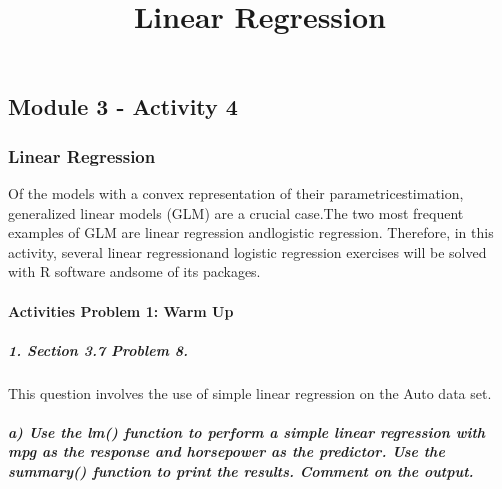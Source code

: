 \documentclass[
  letterpaper,
  DIV=11,
  numbers=noendperiod]{scrartcl}
\title{Linear Regression}
\author{}
\date{}
\let\oldparagraph\paragraph
\renewcommand{\paragraph}[1]{\oldparagraph{#1}\mbox{}}
\let\oldsubparagraph\subparagraph
\renewcommand{\subparagraph}[1]{\oldsubparagraph{#1}\mbox{}}
\begin{document}
\maketitle
\ifdefined\Shaded\renewenvironment{Shaded}{\begin{tcolorbox}[interior hidden, boxrule=0pt, sharp corners, borderline west={3pt}{0pt}{shadecolor}, frame hidden, enhanced, breakable]}{\end{tcolorbox}}\fi

\hypertarget{module-3---activity-4}{%
\subsection{Module 3 - Activity 4}\label{module-3---activity-4}}

\hypertarget{linear-regression}{%
\subsubsection{Linear Regression}\label{linear-regression}}

Of the models with a convex representation of their
parametricestimation, generalized linear models (GLM) are a crucial
case.The two most frequent examples of GLM are linear regression
andlogistic regression. Therefore, in this activity, several linear
regressionand logistic regression exercises will be solved with R
software andsome of its packages.

\hypertarget{activities-problem-1-warm-up}{%
\paragraph{Activities Problem 1: Warm
Up}\label{activities-problem-1-warm-up}}

\hypertarget{section-3.7-problem-8.}{%
\subparagraph{1. Section 3.7 Problem 8.}\label{section-3.7-problem-8.}}

This question involves the use of simple linear regression on the Auto
data set.

\hypertarget{a-use-the-lm-function-to-perform-a-simple-linear-regression-with-mpg-as-the-response-and-horsepower-as-the-predictor.-use-the-summary-function-to-print-the-results.-comment-on-the-output.}{%
\subparagraph{a) Use the lm() function to perform a simple linear
regression with mpg as the response and horsepower as the predictor. Use
the summary() function to print the results. Comment on the
output.}\label{a-use-the-lm-function-to-perform-a-simple-linear-regression-with-mpg-as-the-response-and-horsepower-as-the-predictor.-use-the-summary-function-to-print-the-results.-comment-on-the-output.}}
\end{document}
